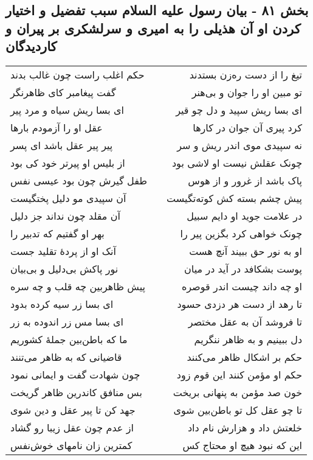 \begin{center}
\section*{بخش ۸۱ - بیان رسول علیه السلام سبب تفضیل و اختیار کردن او آن هذیلی را به امیری و سرلشکری بر پیران و کاردیدگان}
\label{sec:sh081}
\begin{longtable}{l p{0.5cm} r}
حکم اغلب راست چون غالب بدند
&&
تیغ را از دست ره‌زن بستدند
\\
گفت پیغامبر کای ظاهرنگر
&&
تو مبین او را جوان و بی‌هنر
\\
ای بسا ریش سیاه و مرد پیر
&&
ای بسا ریش سپید و دل چو قیر
\\
عقل او را آزمودم بارها
&&
کرد پیری آن جوان در کارها
\\
پیر پیر عقل باشد ای پسر
&&
نه سپیدی موی اندر ریش و سر
\\
از بلیس او پیرتر خود کی بود
&&
چونک عقلش نیست او لاشی بود
\\
طفل گیرش چون بود عیسی نفس
&&
پاک باشد از غرور و از هوس
\\
آن سپیدی مو دلیل پختگیست
&&
پیش چشم بسته کش کوته‌تگیست
\\
آن مقلد چون نداند جز دلیل
&&
در علامت جوید او دایم سبیل
\\
بهر او گفتیم که تدبیر را
&&
چونک خواهی کرد بگزین پیر را
\\
آنک او از پردهٔ تقلید جست
&&
او به نور حق ببیند آنچ هست
\\
نور پاکش بی‌دلیل و بی‌بیان
&&
پوست بشکافد در آید در میان
\\
پیش ظاهربین چه قلب و چه سره
&&
او چه داند چیست اندر قوصره
\\
ای بسا زر سیه کرده بدود
&&
تا رهد از دست هر دزدی حسود
\\
ای بسا مس زر اندوده به زر
&&
تا فروشد آن به عقل مختصر
\\
ما که باطن‌بین جملهٔ کشوریم
&&
دل ببینیم و به ظاهر ننگریم
\\
قاضیانی که به ظاهر می‌تنند
&&
حکم بر اشکال ظاهر می‌کنند
\\
چون شهادت گفت و ایمانی نمود
&&
حکم او مؤمن کنند این قوم زود
\\
بس منافق کاندرین ظاهر گریخت
&&
خون صد مؤمن به پنهانی بریخت
\\
جهد کن تا پیر عقل و دین شوی
&&
تا چو عقل کل تو باطن‌بین شوی
\\
از عدم چون عقل زیبا رو گشاد
&&
خلعتش داد و هزارش نام داد
\\
کمترین زان نامهای خوش‌نفس
&&
این که نبود هیچ او محتاج کس

\end{longtable}
\end{center}
